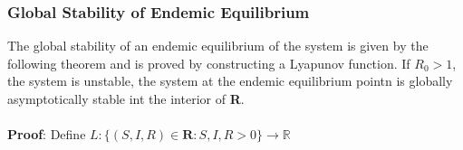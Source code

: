 \documentclass[a4paper,12pt]{report}
\numberwithin{equation}{section}
\begin{document}
\subsubsection{Global Stability of Endemic Equilibrium}
The global stability of an endemic equilibrium of the system is given by the following theorem and is proved by constructing a Lyapunov function.
\theorem If $R_{0} > 1$, the system is unstable, the system at the endemic equilibrium pointn is globally asymptotically  stable int the interior of \textbf{R}.\\ \\
\textbf{Proof}: Define $L :\{(S,I,R)\in \textbf{R} : S,I,R > 0\} \to \mathbb{R}$
\end{document}
